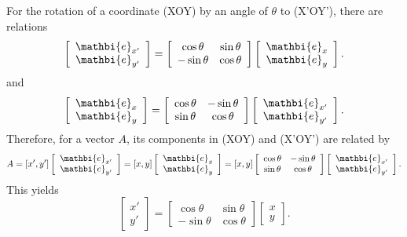 \documentclass[oneside]{book}
\begin{document}
For the rotation of a coordinate (XOY) by an angle of $\theta$ to (X'OY'), there are relations
\begin{equation}
\left[\begin{array}{c}
\mathbi{e}_{x'} \\
\mathbi{e}_{y'}
\end{array}\right]=\left[\begin{array}{cc}
\cos\theta & \sin \theta  \\
-\sin\theta &  \cos \theta       
\end{array}\right]\left[\begin{array}{c}
\mathbi{e}_{x} \\
\mathbi{e}_{y}
\end{array}\right].
\end{equation}
and 
\begin{equation}
\left[\begin{array}{c}
\mathbi{e}_{x} \\
\mathbi{e}_{y}
\end{array}\right]=\left[\begin{array}{cc}
\cos\theta & -\sin \theta  \\
\sin\theta &  \cos \theta       
\end{array}\right]\left[\begin{array}{c}
\mathbi{e}_{x'} \\
\mathbi{e}_{y'}
\end{array}\right].
\end{equation}
Therefore, for a vector $A$, its components in (XOY) and (X'OY') are related by
\begin{equation}
A=[x', y'] \left[\begin{array}{c}
\mathbi{e}_{x'} \\
\mathbi{e}_{y'}
\end{array}\right] = [x, y]\left[\begin{array}{c}
\mathbi{e}_{x} \\
\mathbi{e}_{y}
\end{array}\right]=[x, y] \left[\begin{array}{cc}
\cos\theta & -\sin \theta  \\
\sin\theta &  \cos \theta       
\end{array}\right]\left[\begin{array}{c}
\mathbi{e}_{x'} \\
\mathbi{e}_{y'}
\end{array}\right].
\end{equation}
This yields
\begin{equation}
\left[\begin{array}{c}
x' \\
y'
\end{array}\right]=\left[\begin{array}{cc}
\cos\theta & \sin \theta  \\
-\sin\theta &  \cos \theta       
\end{array}\right]\left[\begin{array}{c}
x \\
y
\end{array}\right].
\end{equation}
\end{document}
